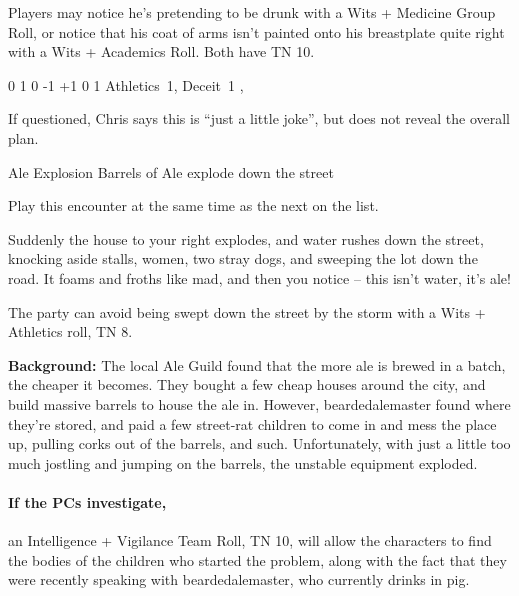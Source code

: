 \begin{multicols}{2}
Players may notice he's pretending to be drunk with a Wits + Medicine Group Roll, or notice that his coat of arms isn't painted onto his breastplate quite right with a Wits + Academics Roll.
Both have TN 10.


  {0}%
  {1}%
  {{0}%
  {-1}%
  {+1}}%
  {0}%
  {1}%
  {Athletics~1, Deceit~1}%
  {\longsword, \completeplate}%
  {\addtocounter{xpbonus}{-3}}

If questioned, Chris says this is ``just a little joke'', but does not reveal the overall plan.

{\squash Ale Explosion}%
{Barrels of Ale explode down the street}%

Play this encounter at the same time as the next on the list.

\begin{boxtext}

  Suddenly the house to your right explodes, and water rushes down the street, knocking aside stalls, women, two stray dogs, and sweeping the lot down the road.  It foams and froths like mad, and then you notice -- this isn't water, it's ale!

\end{boxtext}

The party can avoid being swept down the street by the storm with a Wits + Athletics roll, TN 8.

\textbf{Background:} The local Ale Guild found that the more ale is brewed in a batch, the cheaper it becomes.
They bought a few cheap houses around the city, and build massive barrels to house the ale in.
However, \gls{beardedalemaster} found where they're stored, and paid a few street-rat children to come in and mess the place up, pulling corks out of the barrels, and such.
Unfortunately, with just a little too much jostling and jumping on the barrels, the unstable equipment exploded.

\paragraph{If the PCs investigate,}
an Intelligence + Vigilance Team Roll, TN 10, will allow the characters to find the bodies of the children who started the problem, along with the fact that they were recently speaking with \gls{beardedalemaster}, who currently drinks in \gls{pig}.%
\iftoggle{core}%
{\footnote{See the core rules, page \pageref{teamwork}, for Team Rolls.}}%
{}%


\end{multicols}
